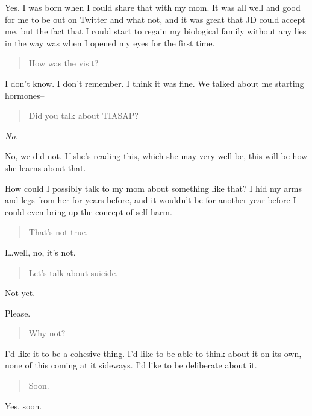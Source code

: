 Yes. I was born when I could share that with my mom. It was all well and good for me to be out on Twitter and what not, and it was great that JD could accept me, but the fact that I could start to regain my biological family without any lies in the way was when I opened my eyes for the first time.

\begin{quote}
How was the visit?
\end{quote}

I don't know. I don't remember. I think it was fine. We talked about me starting hormones--

\begin{quote}
Did you talk about TIASAP?
\end{quote}

\emph{No.}

No, we did not. If she's reading this, which she may very well be, this will be how she learns about that.

How could I possibly talk to my mom about something like that? I hid my arms and legs from her for years before, and it wouldn't be for another year before I could even bring up the concept of self-harm.

\begin{quote}
That's not true.
\end{quote}

I\ldots{}well, no, it's not.

\begin{quote}
Let's talk about suicide.
\end{quote}

Not yet.

Please.

\begin{quote}
Why not?
\end{quote}

I'd like it to be a cohesive thing. I'd like to be able to think about it on its own, none of this coming at it sideways. I'd like to be deliberate about it.

\begin{quote}
Soon.
\end{quote}

Yes, soon.
